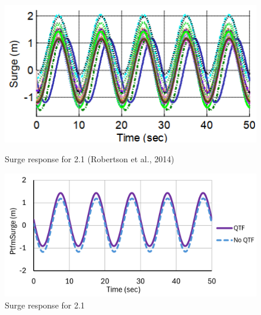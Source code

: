 \documentclass[a4paper, 11pt]{article}
\begin{document}
\begin{figure}[H]
    \begin{minipage}{0.48\textwidth}
        \centering
        \includegraphics[width=1\textwidth]{2.1_surge.png}
        \caption{\small Surge response for 2.1 (Robertson et al., 2014)}
        \label{fig:2.1_surge}
    \end{minipage}
    \hfill
    \begin{minipage}{0.51\textwidth}
        \centering
        \vspace{-0.3cm}
        \includegraphics[width=1\textwidth]{2.1_surge_mine.png}
        \caption{\small Surge response for 2.1}
        \label{fig:2.1_surge_mine}
    \end{minipage}
\end{figure}
\vspace{-0.2cm}
\end{document}
